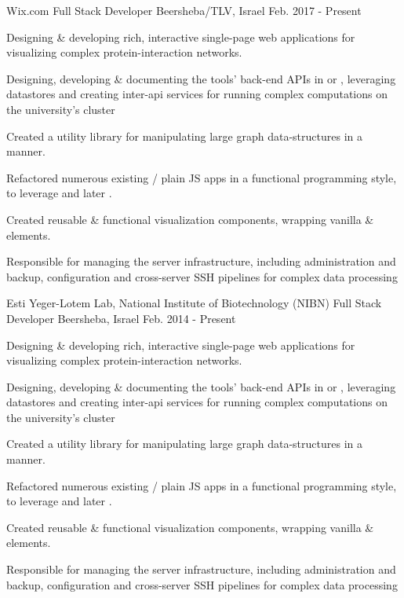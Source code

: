 
\begin{cventries}
      \cventry
    {Wix.com}
    {Full Stack Developer}
    {Beersheba/TLV, Israel}
    {Feb. 2017 - Present}
    {
      \begin{cvitems}
        \item {Designing \& developing rich, interactive single-page web applications for visualizing complex protein-interaction networks.}
        \item {Designing, developing \& documenting the tools' back-end APIs in  or , leveraging  datastores and creating inter-api services for running complex computations on the university's cluster}
        \item {Created a utility library for manipulating large graph data-structures in a  manner.}
        \item {Refactored numerous existing  / plain JS apps in a functional programming style, to leverage  and later .}
        \item {Created reusable \& functional  visualization components, wrapping vanilla  \&  elements.}
        \item {Responsible for managing the server infrastructure, including  administration and backup,  configuration and cross-server SSH pipelines for complex data processing}
      \end{cvitems}
    }
  \cventry
    {Esti Yeger-Lotem Lab, National Institute of Biotechnology (NIBN)}
    {Full Stack Developer}
    {Beersheba, Israel}
    {Feb. 2014 - Present}
    {
      \begin{cvitems}
        \item {Designing \& developing rich, interactive single-page web applications for visualizing complex protein-interaction networks.}
        \item {Designing, developing \& documenting the tools' back-end APIs in  or , leveraging  datastores and creating inter-api services for running complex computations on the university's cluster}
        \item {Created a utility library for manipulating large graph data-structures in a  manner.}
        \item {Refactored numerous existing  / plain JS apps in a functional programming style, to leverage  and later .}
        \item {Created reusable \& functional  visualization components, wrapping vanilla  \&  elements.}
        \item {Responsible for managing the server infrastructure, including  administration and backup,  configuration and cross-server SSH pipelines for complex data processing}
      \end{cvitems}
    }


\end{cventries}
